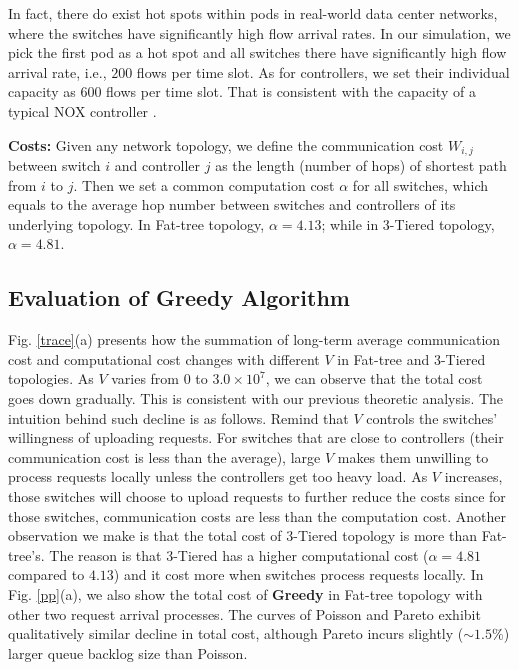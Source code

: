 \documentclass[10pt,journal,compsoc]{IEEEtran}
\begin{document}
In fact, there do exist hot spots within pods in real-world data center networks, where the switches have significantly high flow arrival rates. In our simulation, we pick the first pod as a hot spot and all switches there have significantly high flow arrival rate, i.e., $200$ flows per time slot. As for controllers, we set their individual capacity as $600$ flows per time slot. That is consistent with the capacity of a typical NOX controller \cite{tootoonchian2012controller}.

\textbf{Costs:} Given any network topology, we define the communication cost $W_{i,j}$ between switch $i$ and controller $j$ as the length (number of hops) of shortest path from $i$ to $j$. Then we set a common computation cost $\alpha$ for all switches, which equals to the average hop number between switches and controllers of its underlying topology. In Fat-tree topology, $\alpha = 4.13$; while in 3-Tiered topology, $\alpha = 4.81$.

\subsection{Evaluation of Greedy Algorithm}

Fig. \ref{trace}(a) presents how the summation of long-term average communication cost and computational cost changes with different $V$ in Fat-tree and 3-Tiered topologies. As $V$ varies from $0$ to $3.0 \times 10^7$, we can observe that the total cost goes down gradually. This is consistent with our previous theoretic analysis. The intuition behind such decline is as follows. Remind that $V$ controls the switches' willingness of uploading requests. For switches that are close to controllers (their communication cost is less than the average), large $V$ makes them unwilling to process requests locally unless the controllers get too heavy load. As $V$ increases, those switches will choose to upload requests to further reduce the costs since for those switches, communication costs are less than the computation cost. Another observation we make is that the total cost of 3-Tiered topology is more than Fat-tree's. The reason is that 3-Tiered has a higher computational cost ($\alpha = 4.81$ compared to $4.13$) and it cost more when switches process requests locally. In Fig. \ref{pp}(a), we also show the total cost of {\bf Greedy} in Fat-tree topology with other two request arrival processes. The curves of Poisson and Pareto exhibit qualitatively similar decline in total cost, although Pareto incurs slightly ($\sim 1.5\%$) larger queue backlog size than Poisson.
\end{document}
